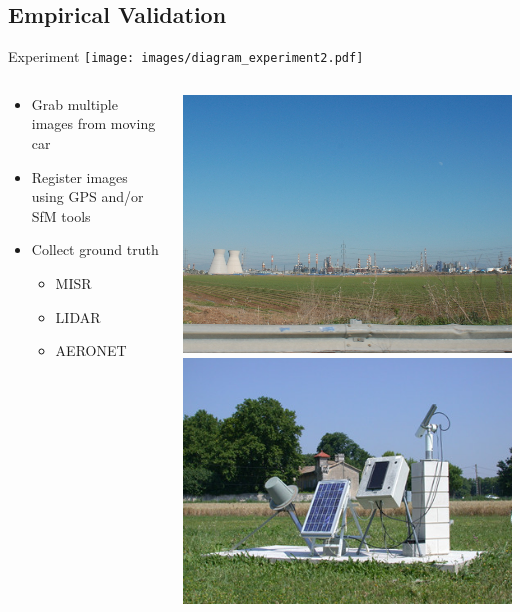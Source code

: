 \documentclass[compress,red,12pt]{beamer}
\begin{document}
\subsection{Empirical Validation}

\begin{frame}{Experiment}
  {
    \centering
    \texttt{[image: images/diagram\_experiment2.pdf]}    
  }
  {
    \begin{columns}[C]
      \begin{column}{.7\textwidth}
        \begin{itemize}
        \item Grab multiple images from moving car
        \item Register images using GPS and/or SfM tools
        \item Collect ground truth
          \begin{itemize}
          \item MISR
          \item LIDAR
          \item AERONET
          \end{itemize}
        \end{itemize}
      \end{column}
      \begin{column}{.3\textwidth}
        \centering
        \includegraphics[height=0.30\textheight]{DSC_0688.JPG}\\
        \includegraphics[height=0.30\textheight]{AERONET.jpg}

\end{column}
\end{columns}}
\end{frame}
\end{document}
